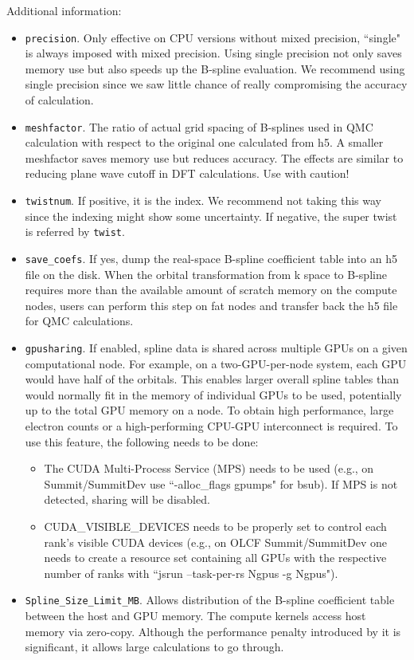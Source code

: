 Additional information:
\begin{itemize}
\item \texttt{precision}. Only effective on CPU versions without mixed precision, ``single" is always imposed with mixed precision. Using single precision not only saves memory use but also speeds up the B-spline evaluation. We recommend using single precision since we saw little chance of really compromising the accuracy of calculation.
\item \texttt{meshfactor}. The ratio of actual grid spacing of B-splines used in QMC calculation with respect to the original one calculated from h5. A smaller meshfactor saves memory use but reduces accuracy. The effects are similar to reducing plane wave cutoff in DFT calculations. Use with caution! 
\item \texttt{twistnum}. If positive, it is the index. We recommend not taking this way since the indexing might show some uncertainty. If negative, the super twist is referred by \texttt{twist}.
\item \texttt{save\_coefs}. If yes, dump the real-space B-spline coefficient table into an h5 file on the disk.
When the orbital transformation from k space to B-spline requires more than the available amount of scratch memory on the compute nodes,
users can perform this step on fat nodes and transfer back the h5 file for QMC calculations.
\item \texttt{gpusharing}. If enabled, spline data is shared across multiple GPUs on a given computational node. For example, on a
two-GPU-per-node system, each GPU would have half of the
orbitals. This enables larger overall spline tables than would normally fit in
the memory of individual GPUs to be used,  potentially up to
the total GPU memory on a node. To obtain high performance, large
electron counts or a high-performing CPU-GPU interconnect is required.
To use this feature, the following needs to be done:
\begin{itemize}
    \item The CUDA Multi-Process Service (MPS) needs to be used
      (e.g., on Summit/SummitDev use ``-alloc\_flags gpumps" for
      bsub). If MPS is not detected, sharing will be disabled.
    \item CUDA\_VISIBLE\_DEVICES needs to be properly set to control each
      rank's visible CUDA devices (e.g., on OLCF Summit/SummitDev one
      needs to create a resource set containing all GPUs with the
      respective number of ranks with ``jsrun --task-per-rs Ngpus -g
      Ngpus").
\end{itemize}
\item \texttt{Spline\_Size\_Limit\_MB}. Allows distribution of the B-spline coefficient table between the host and GPU memory. The compute kernels access host memory via zero-copy. Although the performance penalty introduced by it is significant, it allows large calculations to go through.
\end{itemize}
